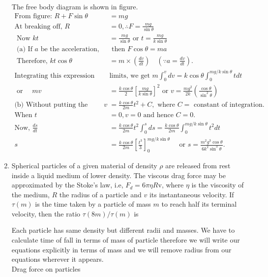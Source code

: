 \begin{enumerate}
\begin{answer}
		The free body diagram is shown in figure.
	\begin{align*}
	\text{From figure: }R+F \sin \theta&=m g\\
	\text{At breaking off, }R&=0, \therefore F=\frac{m g}{\sin \theta}\\
\text{	Now }k t&=\frac{m g}{\sin \theta}\text{ or }t=\frac{m g}{k \sin \theta}\\
\text{	(a) If $a$ be the acceleration,}&\text{ then $F \cos \theta=m a$ }\\
\text{	Therefore, }k t \cos \theta&=m \times\left(\frac{d v}{d t}\right) \quad\left(\because a=\frac{d v}{d t}\right) .\\
\text{Integrating this expression within proper }&\text{limits, we get $m \int_{0}^{v} d v=k \cos \theta \int_{0}^{m g / k \sin \theta} t d t$}\\
\text{ or }\quad m v&=\frac{k \cos \theta}{2}\left[\frac{m g}{k \sin \theta}\right]^{2}\text{ or }v=\frac{m g^{2}}{2 k}\left(\frac{\cos \theta}{\sin ^{2} \theta}\right)\\
\text{(b) Without putting the limits, we have }v&=\frac{k \cos \theta}{2 m} t^{2}+C,\text{ where $C=$ constant of integration.}\\
\text{When }t&=0, v=0\text{ and hence }C=0.\\
\text{Now, }\frac{d s}{d t}&=\frac{k \cos \theta}{2 m} t^{2} \int_{0}^{s} d s=\frac{k \cos \theta}{2 m} \int_{0}^{m g / k \sin \theta} t^{2} d t\\
s&=\frac{k \cos \theta}{2 m}\left[\frac{t^{3}}{3}\right]_{0}^{m g / k \sin \theta} \quad\text{ or }s=\frac{m^{2} g^{3} \cos \theta}{6 k^{2} \sin ^{3} \theta} .
	\end{align*}
\end{answer}
\item Spherical particles of a given material of density $\rho$ are released from rest inside a liquid medium of lower density. The viscous drag force may be approximated by the Stoke's law, i.e, $F_{d}=6 \pi \eta R \mathrm{v}$, where $\eta$ is the viscosity of the medium, $R$ the radius of a particle and $v$ its instantaneous velocity. If $\tau(m)$ is the time taken by a particle of mass $m$ to reach half its terminal velocity, then the ratio $\tau(8 m) / \tau(m)$ is
\begin{answer}
	 Each particle has same density but different radii and masses. We have to calculate time of fall in terms of mass of particle therefore we will write our equations explicitly in terms of mass and we will remove radius from our equations wherever it appears.\\Drag force on particles

\end{answer}
\end{enumerate}
